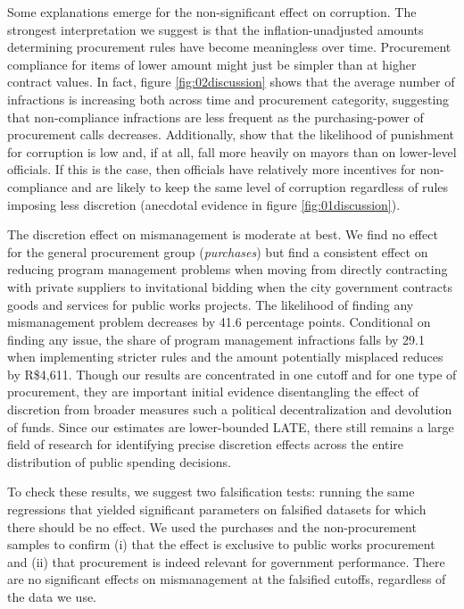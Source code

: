 \documentclass[11pt]{article}
\begin{document}
Some explanations emerge for the non-significant effect on corruption. The strongest interpretation we suggest is that the inflation-unadjusted amounts determining procurement rules have become meaningless over time. Procurement compliance for items of lower amount might just be simpler than at higher contract values. In fact, figure \ref{fig:02discussion} shows that the average number of infractions is increasing both across time and procurement categority, suggesting that non-compliance infractions are less frequent as the purchasing-power of procurement calls decreases. Additionally, \citet{FinanGovernmentAuditsReduce2018} show that the likelihood of punishment for corruption is low and, if at all, fall more heavily on mayors than on lower-level officials. If this is the case, then officials have relatively more incentives for non-compliance and are likely to keep the same level of corruption regardless of rules imposing less discretion (anecdotal evidence in figure \ref{fig:01discussion}).

The discretion effect on mismanagement is moderate at best. We find no effect for the general procurement group (\emph{purchases}) but find a consistent effect on reducing program management problems when moving from directly contracting with private suppliers to invitational bidding when the city government contracts goods and services for public works projects. The likelihood of finding any mismanagement problem decreases by 41.6 percentage points. Conditional on finding any issue, the share of program management infractions falls by 29.1 when implementing stricter rules and the amount potentially misplaced reduces by R\$4,611. Though our results are concentrated in one cutoff and for one type of procurement, they are important initial evidence disentangling the effect of discretion from broader measures such a political decentralization and devolution of funds. Since our estimates are lower-bounded LATE, there still remains a large field of research for identifying precise discretion effects across the entire distribution of public spending decisions.

To check these results, we suggest two falsification tests: running the same regressions that yielded significant parameters on falsified datasets for which there should be no effect. We used the purchases and the non-procurement samples to confirm (i) that the effect is exclusive to public works procurement and (ii) that procurement is indeed relevant for government performance. There are no significant effects on mismanagement at the falsified cutoffs, regardless of the data we use.
\end{document}
